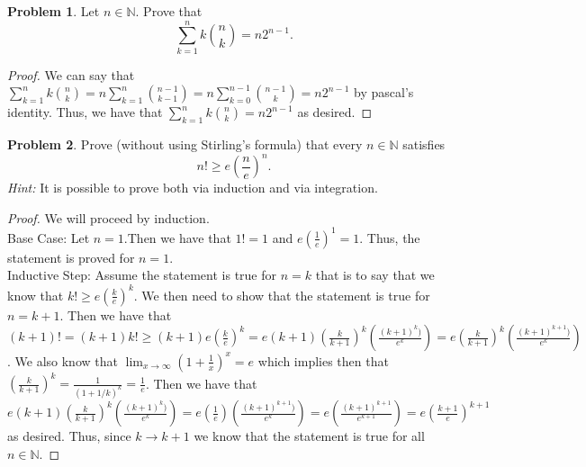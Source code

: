 \documentclass[11pt, letter]{amsart}
\theoremstyle{definition}
\newtheorem{problem}{Problem}[]
\begin{document}
\clearpage
\begin{problem}
  Let $n \in \mathbb N$.  Prove that
  \begin{equation*}
    \sum_{k=1}^n k \binom{n}{k} = n 2^{n - 1}.
  \end{equation*}

\begin{proof}
    We can say that $\sum_{k = 1}^nk\binom{n}{k} = n\sum_{k = 1}^{n}\binom{n-1}{k-1} = n\sum_{k = 0}^{n-1}\binom{n-1}{k} = n2^{n-1}$ by pascal's identity. Thus, we have that $\sum_{k = 1}^nk\binom{n}{k} = n2^{n - 1}$ as desired.
\end{proof}
  
\end{problem}

\clearpage
\begin{problem}
  Prove (without using Stirling's formula) that every $n \in \mathbb N$ satisfies
  \begin{equation*}
    n! \geq e\left(\frac{n}{e}\right)^n.
  \end{equation*}
  \textit{Hint:} It is possible to prove both via induction and via integration.

\begin{proof}
    We will proceed by induction.\\
    Base Case: Let $n = 1$.Then we have that $1! = 1$ and $e(\frac{1}{e})^1 = 1$. Thus, the statement is proved for $n = 1$.\\
    Inductive Step: Assume the statement is true for $n = k$ that is to say that we know that $k! \geq e(\frac{k}{e})^k$. We then need to show that the statement is true for $n = k + 1.$ Then we have that $(k + 1)! = (k + 1)k! \geq (k + 1)e(\frac{k}{e})^k = e(k + 1)(\frac{k}{k + 1})^k(\frac{(k + 1)^k)}{e^k}) = e(\frac{k}{k + 1})^k(\frac{(k + 1)^{k+1})}{e^k})$. We also know that $\lim_{x\to\infty}(1 + \frac{1}{x})^x = e$ which implies then that $(\frac{k}{k + 1})^k = \frac{1}{(1 + 1/k)^k} = \frac{1}{e}$. Then we have that $e(k + 1)(\frac{k}{k + 1})^k(\frac{(k + 1)^k)}{e^k}) = e(\frac{1}{e})(\frac{(k + 1)^{k+1})}{e^k}) = e(\frac{(k + 1)^{k + 1}}{e^{k + 1}}) = e(\frac{k+1}{e})^{k + 1}$ as desired. Thus, since $k \to k + 1$ we know that the statement is true for all $n \in \mathbb{N}.$
\end{proof}
  
\end{problem}
\end{document}
